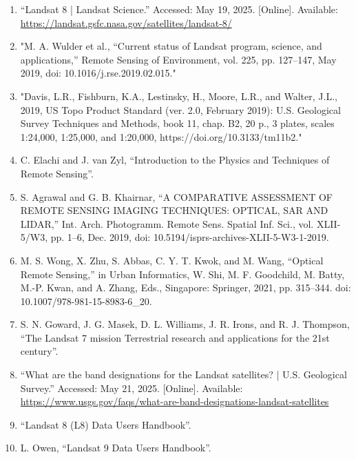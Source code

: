 \documentclass{article}
\begin{document}
\begin{sloppypar}
\begin{enumerate}
    \item{“Landsat 8 | Landsat Science.” Accessed: May 19, 2025. [Online]. Available: \url{https://landsat.gsfc.nasa.gov/satellites/landsat-8/}}

    \item{"M. A. Wulder et al., “Current status of Landsat program, science, and applications,” Remote Sensing of Environment, vol. 225, pp. 127–147, May 2019, doi: 10.1016/j.rse.2019.02.015."}

    \item{"Davis, L.R., Fishburn, K.A., Lestinsky, H., Moore, L.R., and Walter, J.L., 2019, US Topo Product Standard (ver. 2.0, February 2019): U.S. Geological Survey Techniques and Methods, book 11, chap. B2, 20 p., 3 plates, scales 1:24,000, 1:25,000, and 1:20,000, https://doi.org/10.3133/tm11b2."}

    \item{C. Elachi and J. van Zyl, “Introduction to the Physics and Techniques of Remote Sensing”.}

    \item{S. Agrawal and G. B. Khairnar, “A COMPARATIVE ASSESSMENT OF REMOTE SENSING IMAGING TECHNIQUES: OPTICAL, SAR AND LIDAR,” Int. Arch. Photogramm. Remote Sens. Spatial Inf. Sci., vol. XLII-5/W3, pp. 1–6, Dec. 2019, doi: 10.5194/isprs-archives-XLII-5-W3-1-2019.}

    \item{M. S. Wong, X. Zhu, S. Abbas, C. Y. T. Kwok, and M. Wang, “Optical Remote Sensing,” in Urban Informatics, W. Shi, M. F. Goodchild, M. Batty, M.-P. Kwan, and A. Zhang, Eds., Singapore: Springer, 2021, pp. 315–344. doi: 10.1007/978-981-15-8983-6_20.}

    \item{S. N. Goward, J. G. Masek, D. L. Williams, J. R. Irons, and R. J. Thompson, “The Landsat 7 mission Terrestrial research and applications for the 21st century”.}

    \item{“What are the band designations for the Landsat satellites? | U.S. Geological Survey.” Accessed: May 21, 2025. [Online]. Available: \url{https://www.usgs.gov/faqs/what-are-band-designations-landsat-satellites}}

    \item{“Landsat 8 (L8) Data Users Handbook”.}

    \item{L. Owen, “Landsat 9 Data Users Handbook”.}


\end{enumerate}
\end{sloppypar}
\end{document}
